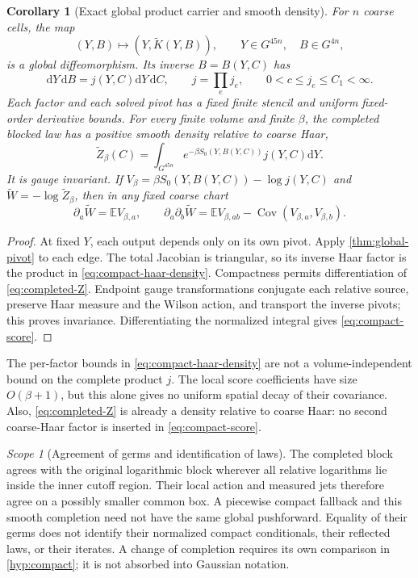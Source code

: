 \documentclass[11pt,oneside,openany]{book}
\newtheorem{corollary}[corollary]{Corollary}
\theoremstyle{definition}
\theoremstyle{remark}
\newtheorem{scope}[scope]{Scope}
\newcommand{\E}{\mathbb E}
\newcommand{\dd}{\mathrm d}
\newcommand{\Cov}{\operatorname{Cov}}
\newcommand{\src}[2]{\cite[#2]{#1}}
\begin{document}
\begin{corollary}[Exact global product carrier and smooth density]
\label{cor:compact-product}
For $n$ coarse cells, the map
\[
 (Y,B)\longmapsto(Y,\widetilde K(Y,B)),\qquad
 Y\in G^{45n},\quad B\in G^{4n},
\]
is a global diffeomorphism. Its inverse $B=B(Y,C)$ has
\begin{equation}\label{eq:compact-haar-density}
 \dd Y\,\dd B=j(Y,C)\dd Y\,\dd C,\qquad
 j=\prod_e j_e,\qquad 0<c\le j_e\le C_1<\infty.
\end{equation}
Each factor and each solved pivot has a fixed finite stencil and
uniform fixed-order derivative bounds. For every finite volume and
finite $\beta$, the completed blocked law has a positive smooth density
relative to coarse Haar,
\begin{equation}\label{eq:completed-Z}
 \widetilde Z_\beta(C)=\int_{G^{45n}}
       e^{-\beta S_0(Y,B(Y,C))}j(Y,C)\dd Y.
\end{equation}
It is gauge invariant. If
$V_\beta=\beta S_0(Y,B(Y,C))-\log j(Y,C)$ and
$\widetilde W=-\log\widetilde Z_\beta$, then in any fixed coarse chart
\begin{equation}\label{eq:compact-score}
 \partial_a\widetilde W=\E V_{\beta,a},\qquad
 \partial_a\partial_b\widetilde W
   =\E V_{\beta,ab}-\Cov(V_{\beta,a},V_{\beta,b}).
\end{equation}
\end{corollary}
\begin{proof}
At fixed $Y$, each output depends only on its own pivot. Apply
\cref{thm:global-pivot} to each edge. The total Jacobian is triangular,
so its inverse Haar factor is the product in
\cref{eq:compact-haar-density}. Compactness permits differentiation of
\cref{eq:completed-Z}. Endpoint gauge transformations conjugate each
relative source, preserve Haar measure and the Wilson action, and
transport the inverse pivots; this proves invariance. Differentiating
the normalized integral gives \cref{eq:compact-score}.
\end{proof}
The per-factor bounds in \cref{eq:compact-haar-density} are not a
volume-independent bound on the complete product $j$. The local score
coefficients have size $O(\beta+1)$, but this alone gives no uniform
spatial decay of their covariance. Also, \cref{eq:completed-Z} is
already a density relative to coarse Haar: no second coarse-Haar
factor is inserted in \cref{eq:compact-score}. \src{F12}{V18}

\begin{scope}[Agreement of germs and identification of laws]
\label{scope:completion-germ}
The completed block agrees with the original logarithmic block wherever
all relative logarithms lie inside the inner cutoff region. Their local
action and measured jets therefore agree on a possibly smaller common
box. A piecewise compact fallback and this smooth completion need not
have the same global pushforward. Equality of their germs does not
identify their normalized compact conditionals, their reflected laws,
or their iterates. A change of completion requires its own comparison
in \cref{hyp:compact}; it is not absorbed into Gaussian notation.
\end{scope}
\end{document}
